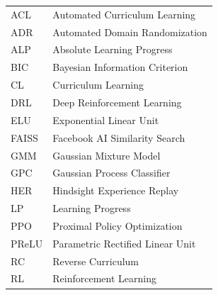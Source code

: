 \begin{tabularx}{\linewidth}{@{}ll@{}}
  ACL   & Automated Curriculum Learning    \\
  ADR   & Automated Domain Randomization   \\
  ALP   & Absolute Learning Progress       \\
  BIC   & Bayesian Information Criterion   \\
  CL    & Curriculum Learning              \\
  DRL   & Deep Reinforcement Learning      \\
  ELU   & Exponential Linear Unit          \\
  FAISS & Facebook AI Similarity Search    \\
  GMM   & Gaussian Mixture Model           \\
  GPC   & Gaussian Process Classifier      \\
  HER   & Hindsight Experience Replay      \\
  LP    & Learning Progress                \\
  PPO   & Proximal Policy Optimization     \\
  PReLU & Parametric Rectified Linear Unit \\
  RC    & Reverse Curriculum               \\
  RL    & Reinforcement Learning           \\
\end{tabularx}

\renewcommand{\arraystretch}{1}
\setlength\tabcolsep{\oldtabcolsep}